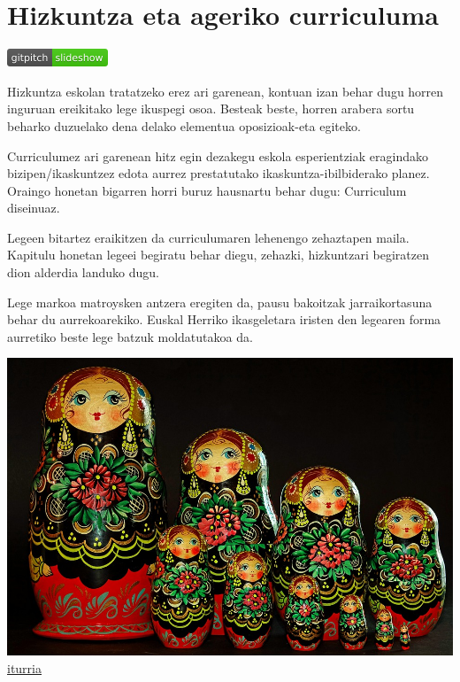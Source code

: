 \documentclass[
]{book}
\begin{document}
\hypertarget{hizkuntza-eta-ageriko-curriculuma}{%
\chapter{Hizkuntza eta ageriko curriculuma}\label{hizkuntza-eta-ageriko-curriculuma}}

\href{https://gitpitch.com/JuanAbasolo/HD/02-gaia?grs=github\&t=moon}{\includegraphics{assets/badge.png}}

Hizkuntza eskolan tratatzeko erez ari garenean, kontuan izan behar dugu horren inguruan ereikitako lege ikuspegi osoa. Besteak beste, horren arabera sortu beharko duzuelako dena delako elementua oposizioak-eta egiteko.

Curriculumez ari garenean hitz egin dezakegu eskola esperientziak eragindako bizipen/ikaskuntzez edota aurrez prestatutako ikaskuntza-ibilbiderako planez. Oraingo honetan bigarren horri buruz hausnartu behar dugu: Curriculum diseinuaz.

Legeen bitartez eraikitzen da curriculumaren lehenengo zehaztapen maila. Kapitulu honetan legeei begiratu behar diegu, zehazki, hizkuntzari begiratzen dion alderdia landuko dugu.

Lege markoa matroysken antzera eregiten da, pausu bakoitzak jarraikortasuna behar du aurrekoarekiko. Euskal Herriko ikasgeletara iristen den legearen forma aurretiko beste lege batzuk moldatutakoa da.

\includegraphics{assets/ornament-3131097_960_720.jpg}
\href{https://pixabay.com/en/ornament-matryoshka-babuschka-3131097/}{iturria}
\end{document}
